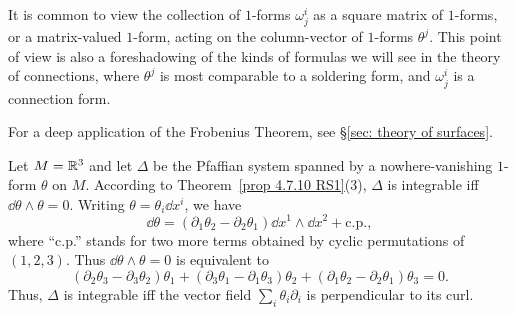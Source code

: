 \begin{rem}
    It is common to view the collection of $1$-forms $\omega^i_j$ as a square matrix of $1$-forms, or a matrix-valued $1$-form, acting on the column-vector of $1$-forms $\theta^j$. This point of view is also a foreshadowing of the kinds of formulas we will see in the theory of connections, where $\theta^j$ is most comparable to a soldering form, and $\omega^i_j$ is a connection form.
\end{rem}

For a deep application of the Frobenius Theorem, see \S\ref{sec: theory of surfaces}.

\begin{example}
    Let $M=\mathbb{R}^3$ and let $\Delta$ be the Pfaffian system spanned by a nowhere-vanishing $1$-form $\theta$ on $M$. According to Theorem~\ref{prop 4.7.10 RS1}(3), $\Delta$ is integrable iff $\dd\theta\wedge\theta=0$. Writing $\theta=\theta_i\dd x^i$, we have
    \[\dd\theta=(\partial_1\theta_2-\partial_2\theta_1)\dd x^1\wedge\dd x^2+\mathrm{c.p.},\]
    where ``c.p.'' stands for two more terms obtained by cyclic permutations of $(1,2,3)$. Thus $\dd\theta\wedge\theta=0$ is equivalent to
    \[(\partial_2\theta_3-\partial_3\theta_2)\theta_1+(\partial_3\theta_1-\partial_1\theta_3)\theta_2+(\partial_1\theta_2-\partial_2\theta_1)\theta_3=0.\]
    Thus, $\Delta$ is integrable iff the vector field $\sum_i \theta_i\partial_i$ is perpendicular to its curl.
\end{example}



